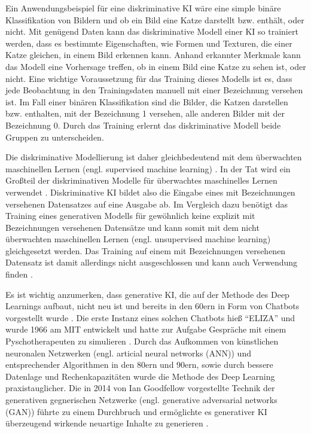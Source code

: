 Ein Anwendungsbeispiel für eine diskriminative KI wäre eine simple binäre Klassifikation von Bildern und ob ein Bild eine Katze darstellt bzw. enthält, oder nicht.
Mit genügend Daten kann das diskriminative Modell einer KI so trainiert werden, dass es bestimmte Eigenschaften, wie Formen und Texturen, die einer Katze gleichen, in einem Bild erkennen kann.
Anhand erkannter Merkmale kann das Modell eine Vorhersage treffen, ob in einem Bild eine Katze zu sehen ist, oder nicht.
Eine wichtige Voraussetzung für das Training dieses Modells ist es, dass jede Beobachtung in den Trainingsdaten manuell mit einer Bezeichnung versehen ist.
Im Fall einer binären Klassifikation sind die Bilder, die Katzen darstellen bzw. enthalten, mit der Bezeichnung 1 versehen, alle anderen Bilder mit der Bezeichnung 0.
Durch das Training erlernt das diskriminative Modell beide Gruppen zu unterscheiden.

Die diskriminative Modellierung ist daher gleichbedeutend mit dem überwachten maschinellen Lernen (engl. supervised machine learning) \cite{orlly-deep-gen-learning}.
In der Tat wird ein Großteil der diskriminativen Modelle für überwachtes maschinelles Lernen verwendet \cite{turing-genai}.
Diskriminative KI bildet also die Eingabe eines mit Bezeichnungen versehenen Datensatzes auf eine Ausgabe ab.
Im Vergleich dazu benötigt das Training eines generativen Modells für gewöhnlich keine explizit mit Bezeichnungen versehenen Datensätze und kann somit mit dem nicht überwachten maschinellen Lernen (engl. unsupervised machine learning) gleichgesetzt werden. 
Das Training auf einem mit Bezeichnungen versehenen Datensatz ist damit allerdings nicht ausgeschlossen und kann auch Verwendung finden \cite{orlly-deep-gen-learning}.

Es ist wichtig anzumerken, dass generative KI, die auf der Methode des Deep Learnings aufbaut, nicht neu ist und bereits in den 60ern in Form von Chatbots vorgestellt wurde \cite{gen-ai-tech-target}.
Die erste Instanz eines solchen Chatbots hieß \enquote{ELIZA} \cite{eliza} und wurde 1966 am MIT entwickelt und hatte zur Aufgabe Gespräche mit einem Pyschotherapeuten zu simulieren \cite{computer-woche-genai}.
Durch das Aufkommen von künstlichen neuronalen Netzwerken (engl. articial neural networks (ANN)) und entsprechender Algorithmen in den 80ern und 90ern, sowie durch bessere Datenlage und Rechenkapazitäten wurde die Methode des Deep Learning praxistauglicher.
Die in 2014 von Ian Goodfellow vorgestellte Technik der generativen gegnerischen Netzwerke (engl. generative adversarial networks (GAN)) führte zu einem Durchbruch und ermöglichte es generativer KI überzeugend wirkende neuartige Inhalte zu generieren \cite{medium-genai-history}.

